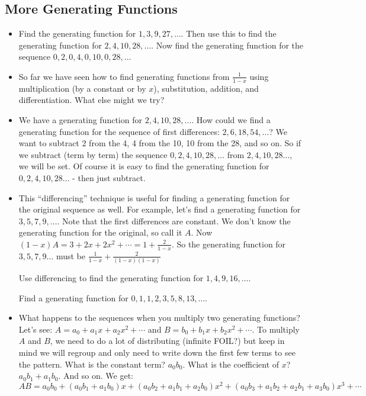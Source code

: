 \subsection*{More Generating Functions}
\begin{itemize}
  \item Find the generating function for $1, 3, 9, 27, \ldots$.  Then use this to find the generating function for $2, 4, 10, 28, \ldots$.  Now find the generating function for the sequence $0, 2, 0, 4, 0, 10, 0 , 28, \ldots$
  
  \item So far we have seen how to find generating functions from $\frac{1}{1-x}$ using multiplication (by a constant or by $x$), substitution, addition, and differentiation.  What else might we try?  
  
  \item We have a generating function for $2, 4, 10, 28, \ldots$.  How could we find a generating function for the sequence of first differences: $2, 6, 18, 54,\ldots$?  We want to subtract 2 from the 4, 4 from the 10, 10 from the 28, and so on.  So if we subtract (term by term) the sequence $0, 2, 4, 10, 28,\ldots$ from $2, 4, 10, 28\ldots$, we will be set.  Of course it is easy to find the generating function for $0,2,4,10,28\ldots$ - then just subtract.
  
  \item This ``differencing'' technique is useful for finding a generating function for the original sequence as well.  For example, let's find a generating function for $3, 5, 7, 9,\ldots$.  Note that the first differences are constant.  We don't know the generating function for the original, so call it $A$.  Now $(1-x)A = 3 + 2x + 2x^2 + \cdots = 1 + \frac{2}{1-x}$.  So the generating function for $3, 5, 7, 9\ldots$ must be $\frac{1}{1-x} + \frac{2}{(1-x)(1-x)}$
  
  \ex Use differencing to find the generating function for $1, 4, 9, 16, \ldots$.
  
  \ex Find a generating function for $0, 1, 1, 2, 3, 5, 8, 13, \ldots$.
  
  \item What happens to the sequences when you multiply two generating functions?  Let's see: $A = a_0 + a_1x + a_2x^2 + \cdots$ and $B = b_0 + b_1x + b_2x^2 + \cdots$.  To multiply $A$ and $B$, we need to do a lot of distributing (infinite FOIL?) but keep in mind we will regroup and only need to write down the first few terms to see the pattern.  What is the constant term?  $a_0b_0$.  What is the coefficient of $x$?  $a_0b_1 + a_1b_0$.  And so on.  We get:
  \[AB = a_0b_0 + (a_0b_1 + a_1b_0)x + (a_0b_2 + a_1b_1 + a_2b_0)x^2 + (a_0b_3 + a_1b_2 + a_2b_1 + a_3b_0)x^3 + \cdots\]
  

\end{itemize}
